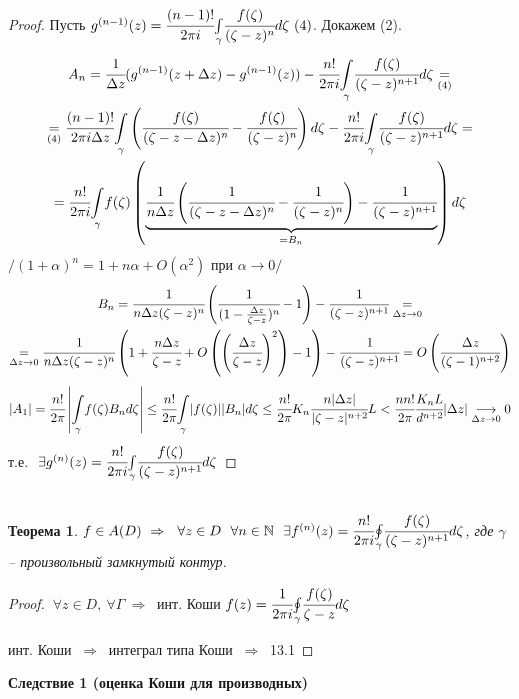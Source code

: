 \documentclass[draft]{article}
\renewcommand{\bf}{\bfseries}
\newcommand{\then}{\ \Rightarrow\ }
\newcommand{\N}{\mathbb{N}}
\newcommand{\mint}[2]{\underset{#1}{\overset{#2}{\int}}}
\newcommand{\moint}[1]{\underset{#1}{\oint}}
\renewcommand{\a}{\alpha}
\newcommand{\g}{\gamma}
\newcommand{\G}{\Gamma}
\newcommand{\D}{\Delta}
\newcommand{\E}{\ \exists}
\newcommand{\F}{\ \forall}
\newcommand{\lra}[1]{\underset{#1}{\longrightarrow}}
\newtheorem*{theor}{Теорема}
\theoremstyle{remark}
\begin{document}
\begin{proof}
Пусть $g^{(n-1)}(z)=\cfrac{(n-1)!}{2\pi i}\mint{\g}{}\cfrac{f(\zeta)}{(\zeta-z)^n}d\zeta\ (4)$. Докажем (2).
\begin{multline*}
A_n=\cfrac1{\D z}(g^{(n-1)}(z+\D z)-g^{(n-1)}(z))-\cfrac{n!}{2\pi i}\mint{\g}{}\cfrac{f(\zeta)}{(\zeta-z)^{n+1}}d\zeta\underset{(4)}{=}\\
\underset{(4)}{=}\cfrac{(n-1)!}{2\pi i\D z}\mint{\g}{}\left(\cfrac{f(\zeta)}{(\zeta-z-\D z)^n}-\cfrac{f(\zeta)}{(\zeta-z)^n}\right)d\zeta-\cfrac{n!}{2\pi i}\mint{\g}{}\cfrac{f(\zeta)}{(\zeta-z)^{n+1}}d\zeta=\\
=\cfrac{n!}{2\pi i}\mint{\g}{}f(\zeta)\left(\underset{=B_n}{\underbrace{\cfrac1{n\D z}\left(\cfrac1{(\zeta-z-\D z)^n}-\cfrac1{(\zeta-z)^n}\right)-\cfrac1{(\zeta-z)^{n+1}}}}\right)d\zeta
\end{multline*}
$/(1+\a)^n=1+n\a+O(\a^2)$ при $\a\to0/$
\begin{multline*}
B_n=\cfrac1{n\D z(\zeta-z)^n}\left(\cfrac1{(1-\frac{\D z}{\zeta-z})^n}-1\right)-\cfrac1{(\zeta-z)^{n+1}}\underset{\D z\to 0}{=}\\
\underset{\D z\to 0}{=}\cfrac1{n\D z(\zeta-z)^n}\left(1+\cfrac{n\D z}{\zeta-z}+O\left(\left(\cfrac{\D z}{\zeta-z}\right)^2\right)-1\right)-\cfrac1{(\zeta-z)^{n+1}}=O\left(\cfrac{\D z}{(\zeta-1)^{n+2}}\right)
\end{multline*}
$$|A_1|=\cfrac{n!}{2\pi}\left|\mint{\g}{}f(\zeta)B_nd\zeta\right|\leq\cfrac{n!}{2\pi}\mint{\g}{}|f(\zeta)||B_n|d\zeta\leq\cfrac{n!}{2\pi}K_n\cfrac{n|\D z|}{|\zeta-z|^{n+2}}L<\cfrac{nn!}{2\pi}\cfrac{K_nL}{d^{n+2}}|\D z|\lra{\D z\to0}0$$
т.е. $\E g^{(n)}(z)=\cfrac{n!}{2\pi i}\mint{\g}{}\cfrac{f(\zeta)}{(\zeta-z)^{n+1}}d\zeta$
\end{proof}

\subsection{}

\begin{theor}
$f\in A(D)\then \F z\in D\ \F n\in\N\ \E f^{(n)}(z)=\cfrac{n!}{2\pi i}\moint{\g}\cfrac{f(\zeta)}{(\zeta-z)^{n+1}}d\zeta$, где $\g$ -- произвольный замкнутый контур.
\end{theor}
\begin{proof}
$\F z\in D,\F \G \then$ инт. Коши $f(z)=\cfrac{1}{2\pi i}\moint{\g}\cfrac{f(\zeta)}{\zeta-z}d\zeta$

инт. Коши $\then$ интеграл типа Коши $\then$ 13.1
\end{proof}
{\bf Следствие 1 (оценка Коши для производных)}
\end{document}
